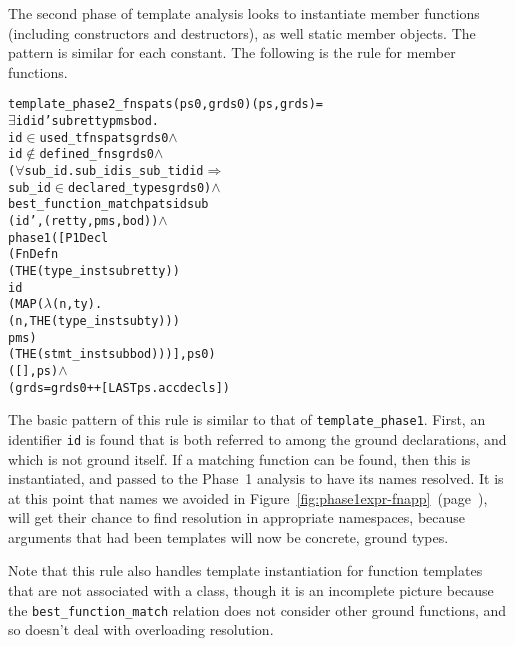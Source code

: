 \documentclass[11pt]{article}
\begin{document}
The second phase of template analysis looks to instantiate member
functions (including constructors and destructors),  as well static
member objects.  The pattern is similar for each constant.  The following is
the rule for member functions.
\begin{center}
\begin{minipage}{\textwidth}
\begin{alltt}
   template_phase2_fns pats (ps0, grds0) (ps, grds) =
     \(\exists\)id id' sub retty pms bod.
       id \(\in\) used_tfns pats grds0 \(\land\)
       id \(\not\in\) defined_fns grds0 \(\land\)
       (\(\forall\)sub_id. sub_id is_sub_tid id \(\Rightarrow\)
                 sub_id \(\in\) declared_types grds0) \(\land\)
       best_function_match pats id sub
                           (id', (retty, pms, bod)) \(\land\)
       phase1 ([P1Decl
                  (FnDefn
                     (THE (type_inst sub retty))
                     id
                     (MAP (\(\lambda\)(n,ty).
                             (n,THE (type_inst sub ty)))
                          pms)
                     (THE (stmt_inst sub bod)))], ps0)
              ([], ps) \(\land\)
       (grds = grds0 ++ [LAST ps.accdecls])
\end{alltt}
\end{minipage}
\end{center}
The basic pattern of this rule is similar to that of
\texttt{template_phase1}.  First, an identifier \texttt{id} is found
that is both referred to among the ground declarations, and which is
not ground itself.  If a matching function can be found, then this is
instantiated, and passed to the Phase~1 analysis to have its names
resolved.  It is at this point that names we avoided in
Figure~\ref{fig:phase1expr-fnapp}~(page~\pageref{fig:phase1expr-fnapp}),
will get their chance to find resolution in appropriate namespaces,
because arguments that had been templates will now be concrete, ground
types.

Note that this rule also handles template instantiation for function
templates that are not associated with a class, though it is an
incomplete picture because the \texttt{best_function_match} relation
does not consider other ground functions, and so doesn't deal with
overloading resolution.
\end{document}
